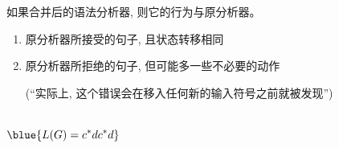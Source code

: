 \begin{frame}{}
  \begin{center}
    \begin{theorem}
      如果合并后的语法分析器, 则它的行为与原分析器。
    \end{theorem}

    \vspace{0.80cm}
    \begin{enumerate}[(1)]
      \setlength{\itemsep}{15pt}
      \item {}原分析器所接受的句子, 且状态转移相同
      \item {}原分析器所拒绝的句子, 但可能多一些不必要的动作

        \pause
        \vspace{0.50cm}
        (``实际上, 这个错误会在移入任何新的输入符号之前就被发现'')
    \end{enumerate}
  \end{center}
\end{frame}

\begin{frame}{}
  \begin{center}

    \begin{columns}

        \[
          \blue{L(G) = c^{\ast}dc^{\ast}d}
        \]
    \end{columns}

    \vspace{0.20cm}
  \end{center}
\end{frame}

\begin{frame}{}
  \begin{center}
    \begin{columns}
    \end{columns}

    \pause
    \vspace{0.60cm}

    \pause
    \vspace{0.50cm}
  \end{center}
\end{frame}

